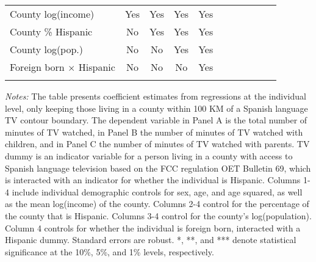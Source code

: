 \begin{table}[!htbp]
{\begin{threeparttable}
\begin{tabular}{lcccccccccc}
				County log(income) & Yes & Yes & Yes & Yes \\
				County \% Hispanic & No & Yes & Yes & Yes \\
				County log(pop.) & No & No & Yes & Yes \\
				Foreign born $\times$ Hispanic & No & No & No & Yes \\ 
				\addlinespace\hline\hline
			\end{tabular}
			\begin{tablenotes}[flushleft]
				\item \textit{Notes:} The table presents coefficient estimates from regressions at the individual level, only keeping those living in a county within 100 KM of a Spanish language TV contour boundary. The dependent variable in Panel A is the total number of minutes of TV watched, in Panel B the number of minutes of TV watched with children, and in Panel C the number of minutes of TV watched with parents. TV dummy is an indicator variable for a person living in a county with access to Spanish language television based on the FCC regulation OET Bulletin 69, which is interacted with an indicator for whether the individual is Hispanic. Columns 1-4 include individual demographic controls for sex, age, and age squared, as well as the mean log(income) of the county. Columns 2-4 control for the percentage of the county that is Hispanic. Columns 3-4 control for the county's log(population). Column 4 controls for whether the individual is foreign born, interacted with a Hispanic dummy. Standard errors are robust. *, **, and *** denote statistical significance at the 10\%, 5\%, and 1\% levels, respectively.
			\end{tablenotes}
		\end{threeparttable}
	}
\end{table}